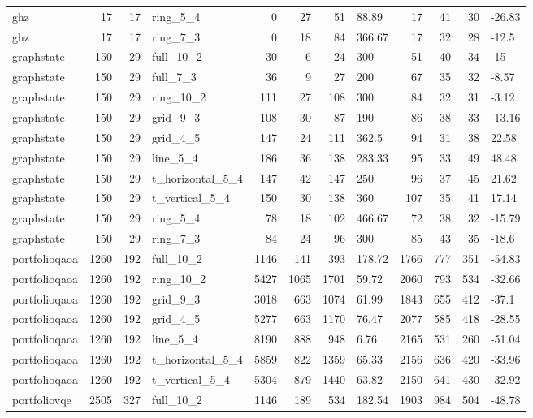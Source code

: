 \begin{longtable}{lrrlrrrlrrrl}
ghz & 17 & 17 & ring\_5\_4 & 0 & 27 & 51 & 88.89 & 17 & 41 & 30 & -26.83 \\
ghz & 17 & 17 & ring\_7\_3 & 0 & 18 & 84 & 366.67 & 17 & 32 & 28 & -12.5 \\
graphstate & 150 & 29 & full\_10\_2 & 30 & 6 & 24 & 300 & 51 & 40 & 34 & -15 \\
graphstate & 150 & 29 & full\_7\_3 & 36 & 9 & 27 & 200 & 67 & 35 & 32 & -8.57 \\
graphstate & 150 & 29 & ring\_10\_2 & 111 & 27 & 108 & 300 & 84 & 32 & 31 & -3.12 \\
graphstate & 150 & 29 & grid\_9\_3 & 108 & 30 & 87 & 190 & 86 & 38 & 33 & -13.16 \\
graphstate & 150 & 29 & grid\_4\_5 & 147 & 24 & 111 & 362.5 & 94 & 31 & 38 & 22.58 \\
graphstate & 150 & 29 & line\_5\_4 & 186 & 36 & 138 & 283.33 & 95 & 33 & 49 & 48.48 \\
graphstate & 150 & 29 & t\_horizontal\_5\_4 & 147 & 42 & 147 & 250 & 96 & 37 & 45 & 21.62 \\
graphstate & 150 & 29 & t\_vertical\_5\_4 & 150 & 30 & 138 & 360 & 107 & 35 & 41 & 17.14 \\
graphstate & 150 & 29 & ring\_5\_4 & 78 & 18 & 102 & 466.67 & 72 & 38 & 32 & -15.79 \\
graphstate & 150 & 29 & ring\_7\_3 & 84 & 24 & 96 & 300 & 85 & 43 & 35 & -18.6 \\
portfolioqaoa & 1260 & 192 & full\_10\_2 & 1146 & 141 & 393 & 178.72 & 1766 & 777 & 351 & -54.83 \\
portfolioqaoa & 1260 & 192 & ring\_10\_2 & 5427 & 1065 & 1701 & 59.72 & 2060 & 793 & 534 & -32.66 \\
portfolioqaoa & 1260 & 192 & grid\_9\_3 & 3018 & 663 & 1074 & 61.99 & 1843 & 655 & 412 & -37.1 \\
portfolioqaoa & 1260 & 192 & grid\_4\_5 & 5277 & 663 & 1170 & 76.47 & 2077 & 585 & 418 & -28.55 \\
portfolioqaoa & 1260 & 192 & line\_5\_4 & 8190 & 888 & 948 & 6.76 & 2165 & 531 & 260 & -51.04 \\
portfolioqaoa & 1260 & 192 & t\_horizontal\_5\_4 & 5859 & 822 & 1359 & 65.33 & 2156 & 636 & 420 & -33.96 \\
portfolioqaoa & 1260 & 192 & t\_vertical\_5\_4 & 5304 & 879 & 1440 & 63.82 & 2150 & 641 & 430 & -32.92 \\
portfoliovqe & 2505 & 327 & full\_10\_2 & 1146 & 189 & 534 & 182.54 & 1903 & 984 & 504 & -48.78 \\

\end{longtable}
